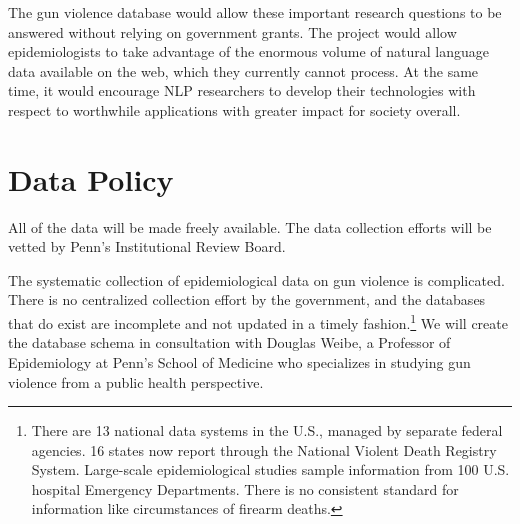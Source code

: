 \documentclass[11pt]{article}
\begin{document}
The gun violence database would allow these important research questions to be answered without relying on government grants. The project would allow epidemiologists to take advantage of the enormous volume of natural language data available on the web, which they currently cannot process. At the same time, it would encourage NLP researchers to develop their technologies with respect to worthwhile applications with greater impact for society overall. 


\section{Data Policy}

All of the data will be made freely available.  The data collection efforts will be vetted by Penn's Institutional Review Board.  



The systematic collection of epidemiological data on gun violence is complicated.  There is no centralized collection effort by the government, and the databases that do exist are incomplete and not updated in a timely fashion.\footnote{
There are 13 national data systems in the U.S., managed by separate federal agencies. 16 states now report through the National Violent Death Registry System.  Large-scale epidemiological studies sample information from 100 U.S. hospital Emergency Departments.   There is no consistent standard for information like circumstances of firearm deaths.
} We will create the database schema in consultation with Douglas Weibe, a Professor of Epidemiology  at Penn's School of Medicine who specializes in studying gun violence from a public health perspective. 
\end{document}

